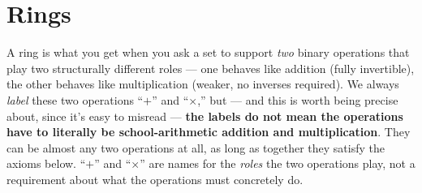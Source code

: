 \section{Rings}
\label{sec:L1:rings}

A ring is what you get when you ask a set to support \emph{two} binary operations that play two structurally different roles --- one behaves like addition (fully invertible), the other behaves like multiplication (weaker, no inverses required). We always \emph{label} these two operations ``$+$'' and ``$\times$,'' but --- and this is worth being precise about, since it's easy to misread --- \textbf{the labels do not mean the operations have to literally be school-arithmetic addition and multiplication}. They can be almost any two operations at all, as long as together they satisfy the axioms below. ``$+$'' and ``$\times$'' are names for the \emph{roles} the two operations play, not a requirement about what the operations must concretely do.

